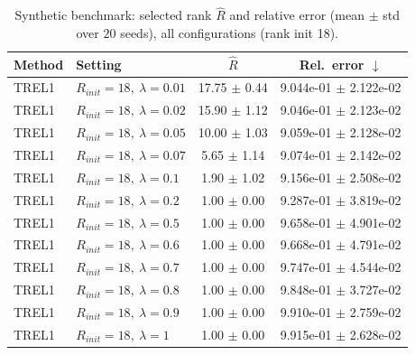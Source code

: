 \begin{table}[t]
\centering
\caption{Synthetic benchmark: selected rank \(\hat R\) and relative error (mean \(\pm\) std over \(20\) seeds), all configurations (rank init 18).}
\label{tab:results_synth_all}
\begin{tabular}{@{}llcc@{}}
\toprule
Method & Setting & \(\hat R\) & Rel.\ error \(\downarrow\) \\ \midrule
TREL1 & \(R_{init}=18,\ \lambda=0.01\) & 17.75 $\pm$ 0.44 & 9.044e-01 $\pm$ 2.122e-02 \\
TREL1 & \(R_{init}=18,\ \lambda=0.02\) & 15.90 $\pm$ 1.12 & 9.046e-01 $\pm$ 2.123e-02 \\
TREL1 & \(R_{init}=18,\ \lambda=0.05\) & 10.00 $\pm$ 1.03 & 9.059e-01 $\pm$ 2.128e-02 \\
TREL1 & \(R_{init}=18,\ \lambda=0.07\) & 5.65 $\pm$ 1.14 & 9.074e-01 $\pm$ 2.142e-02 \\
TREL1 & \(R_{init}=18,\ \lambda=0.1\) & 1.90 $\pm$ 1.02 & 9.156e-01 $\pm$ 2.508e-02 \\
TREL1 & \(R_{init}=18,\ \lambda=0.2\) & 1.00 $\pm$ 0.00 & 9.287e-01 $\pm$ 3.819e-02 \\
TREL1 & \(R_{init}=18,\ \lambda=0.5\) & 1.00 $\pm$ 0.00 & 9.658e-01 $\pm$ 4.901e-02 \\
TREL1 & \(R_{init}=18,\ \lambda=0.6\) & 1.00 $\pm$ 0.00 & 9.668e-01 $\pm$ 4.791e-02 \\
TREL1 & \(R_{init}=18,\ \lambda=0.7\) & 1.00 $\pm$ 0.00 & 9.747e-01 $\pm$ 4.544e-02 \\
TREL1 & \(R_{init}=18,\ \lambda=0.8\) & 1.00 $\pm$ 0.00 & 9.848e-01 $\pm$ 3.727e-02 \\
TREL1 & \(R_{init}=18,\ \lambda=0.9\) & 1.00 $\pm$ 0.00 & 9.910e-01 $\pm$ 2.759e-02 \\
TREL1 & \(R_{init}=18,\ \lambda=1\) & 1.00 $\pm$ 0.00 & 9.915e-01 $\pm$ 2.628e-02 \\
\bottomrule
\end{tabular}
\end{table}